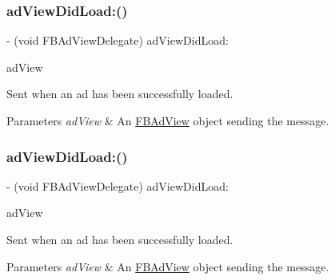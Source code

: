 \subsubsection{\texorpdfstring{ad\+View\+Did\+Load\+:()}{adViewDidLoad:()}\hspace{0.1cm}{\footnotesize\ttfamily [3/5]}}
{\footnotesize\ttfamily -\/ (void F\+B\+Ad\+View\+Delegate) ad\+View\+Did\+Load\+: \begin{DoxyParamCaption}\item[{(\hyperlink{interfaceFBAdView}{F\+B\+Ad\+View} $\ast$)}]{ad\+View }\end{DoxyParamCaption}\hspace{0.3cm}{\ttfamily [optional]}}

Sent when an ad has been successfully loaded.


\begin{DoxyParams}{Parameters}
{\em ad\+View} & An \hyperlink{interfaceFBAdView}{F\+B\+Ad\+View} object sending the message. \\
\hline
\end{DoxyParams}
\mbox{\label{protocolFBAdViewDelegate_01-p_a77334fc3e7bcc1f4ed61e1fbd372359a}} 
\subsubsection{\texorpdfstring{ad\+View\+Did\+Load\+:()}{adViewDidLoad:()}\hspace{0.1cm}{\footnotesize\ttfamily [4/5]}}
{\footnotesize\ttfamily -\/ (void F\+B\+Ad\+View\+Delegate) ad\+View\+Did\+Load\+: \begin{DoxyParamCaption}\item[{(\hyperlink{interfaceFBAdView}{F\+B\+Ad\+View} $\ast$)}]{ad\+View }\end{DoxyParamCaption}\hspace{0.3cm}{\ttfamily [optional]}}

Sent when an ad has been successfully loaded.


\begin{DoxyParams}{Parameters}
{\em ad\+View} & An \hyperlink{interfaceFBAdView}{F\+B\+Ad\+View} object sending the message. \\
\hline
\end{DoxyParams}
\mbox{\label{protocolFBAdViewDelegate_01-p_a77334fc3e7bcc1f4ed61e1fbd372359a}} 
